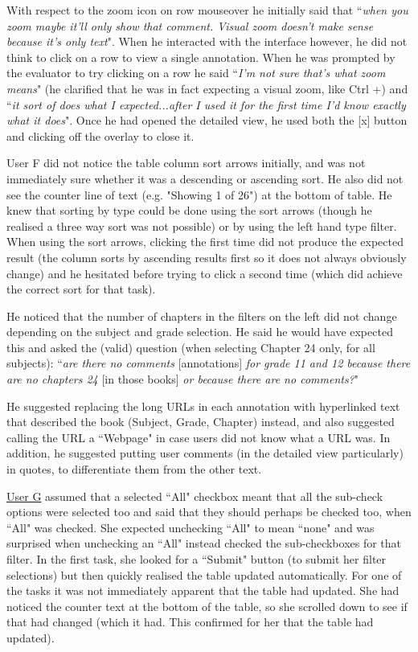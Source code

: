 With respect to the zoom icon on row mouseover he initially said that ``\textit{when you zoom maybe it'll only show that comment. Visual zoom doesn't make sense because it's only text}". When he interacted with the interface however, he did not think to click on a row to view a single annotation.  When he was prompted by the evaluator to try clicking on a row he said ``\textit{I'm not sure that's what zoom means}" (he clarified that he was in fact expecting a visual zoom, like Ctrl +) and ``\textit{it sort of does what I expected...after I used it for the first time I'd know exactly what it does}". Once he had opened the detailed view, he used both the [x] button and clicking off the overlay to close it. 

User F did not notice the table column sort arrows initially, and was not immediately sure whether it was a descending or ascending sort. He also did not see the counter line of text (e.g. "Showing 1 of 26") at the bottom of table. He knew that sorting by type could be done using the sort arrows (though he realised a three way sort was not possible) or by using the left hand type filter. When using the sort arrows, clicking the first time did not produce the expected result (the column sorts by ascending results first so it does not always obviously change) and he hesitated before trying to click a second time (which did achieve the correct sort for that task).

He noticed that the number of chapters in the filters on the left did not change depending on the subject and grade selection. He said he would have expected this and asked the (valid) question (when selecting Chapter 24 only, for all subjects):  ``\textit{are there no comments} [annotations] \textit{for grade 11 and 12 because there are no chapters 24} [in those books] \textit{or because there are no comments?}"

He suggested replacing the long URLs in each annotation with hyperlinked text that described the book (Subject, Grade, Chapter) instead, and also suggested calling the URL a ``Webpage" in case users did not know what a URL was. In addition, he suggested putting user comments (in the detailed view particularly) in quotes, to differentiate them from the other text.  

\underline{User G} assumed that a selected ``All" checkbox meant that all the sub-check options were selected too and said that they should perhaps be checked too, when ``All" was checked.  She expected unchecking ``All" to mean ``none" and was surprised when unchecking an ``All" instead checked the sub-checkboxes for that filter. In the first task, she looked for a ``Submit" button (to submit her filter selections) but then quickly realised the table updated automatically. For one of the tasks it was not immediately apparent that the table had updated. She had noticed the counter text at the bottom of the table, so she scrolled down to see if that had changed (which it had. This confirmed for her that the table had updated). 

